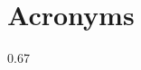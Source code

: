 \chapter*{Acronyms}

\begin{acronym}[OFDI]
{\setlength{\baselineskip}%
{0.67\baselineskip}








\par}

\end{acronym}
